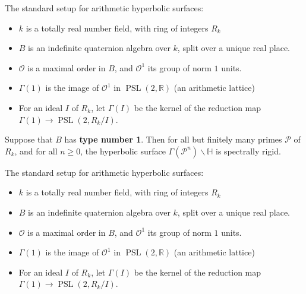 \documentclass{beamer}
\begin{document}
\begin{frame}
	The standard setup for arithmetic hyperbolic surfaces:
	\pause
	\begin{itemize} 
		\item $k$ is a totally real number field, with ring of integers $R_k$ \pause
		\item $B$ is an indefinite quaternion algebra over $k$, split over a unique real place. \pause
		\item $\mathcal{O}$ is a maximal order in $B$, and $\mathcal{O}^1$ its group of norm $1$ units.  \pause
		\item $\Gamma(1)$ is the image of $\mathcal{O}^1$ in $\operatorname{PSL}(2,\mathbb{R})$ (an arithmetic lattice) \pause
		\item For an ideal $I$ of $R_k$, let $\Gamma(I)$ be the kernel of the reduction map $\Gamma(1) \to \operatorname{PSL}(2,R_k/I)$.
	\end{itemize}
\end{frame}

\begin{frame} 
	\begin{theorem}
		Suppose that $B$ has \textbf{type number 1}. Then for all but finitely many primes $\mathcal{P}$ of $R_k$,  and for all $n\geq 0$, the hyperbolic surface $\Gamma(\mathcal{P}^{n}) \backslash \mathbb{H}$ is spectrally rigid.   
	\end{theorem}
	
	\bigbreak
	The standard setup for arithmetic hyperbolic surfaces:
	\begin{itemize} 
		\item $k$ is a totally real number field, with ring of integers $R_k$
		\item $B$ is an indefinite quaternion algebra over $k$, split over a unique real place.
		\item $\mathcal{O}$ is a maximal order in $B$, and $\mathcal{O}^1$ its group of norm $1$ units.
		\item $\Gamma(1)$ is the image of $\mathcal{O}^1$ in $\operatorname{PSL}(2,\mathbb{R})$ (an arithmetic lattice)
		\item For an ideal $I$ of $R_k$, let $\Gamma(I)$ be the kernel of the reduction map $\Gamma(1) \to \operatorname{PSL}(2,R_k/I)$.
	\end{itemize}
\end{frame}
\end{document}
